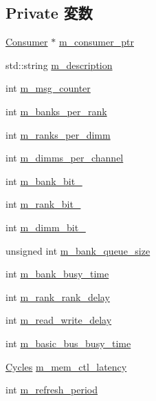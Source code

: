 \subsection*{Private 変数}
\begin{DoxyCompactItemize}
\item 
\hyperlink{classConsumer}{Consumer} $\ast$ \hyperlink{classRubyMemoryControl_a83dd1dc8eef330b0c0d184a4167b26b4}{m\_\-consumer\_\-ptr}
\item 
std::string \hyperlink{classRubyMemoryControl_ad50eef5f7fcfa30f62e14f0fac2a4f6e}{m\_\-description}
\item 
int \hyperlink{classRubyMemoryControl_acfac131e63985feff04ed11cbaf0d221}{m\_\-msg\_\-counter}
\item 
int \hyperlink{classRubyMemoryControl_af5a8b76f5c8fdb638e49a8c11c61f492}{m\_\-banks\_\-per\_\-rank}
\item 
int \hyperlink{classRubyMemoryControl_a734869c8bd10780ed7f61eadb638f30c}{m\_\-ranks\_\-per\_\-dimm}
\item 
int \hyperlink{classRubyMemoryControl_acf7c3dd8c1a61ce9fe7ca2e026150caf}{m\_\-dimms\_\-per\_\-channel}
\item 
int \hyperlink{classRubyMemoryControl_a767e3298a0e794bb0c8f422021e6b67d}{m\_\-bank\_\-bit\_}
\item 
int \hyperlink{classRubyMemoryControl_a2262efb9776ae0e8119e999c6efed38b}{m\_\-rank\_\-bit\_}
\item 
int \hyperlink{classRubyMemoryControl_a9d9676a8a7c87644cefbe758f0ef719c}{m\_\-dimm\_\-bit\_}
\item 
unsigned int \hyperlink{classRubyMemoryControl_a6cbe212586b315223f76b124953ea4b2}{m\_\-bank\_\-queue\_\-size}
\item 
int \hyperlink{classRubyMemoryControl_ab11322175e2e2ec5d6ebef835774bc1a}{m\_\-bank\_\-busy\_\-time}
\item 
int \hyperlink{classRubyMemoryControl_a88f33889677c076f1e5fdd8ce7cabc4d}{m\_\-rank\_\-rank\_\-delay}
\item 
int \hyperlink{classRubyMemoryControl_a469ba8ed68dfdab637a67909cd7f494f}{m\_\-read\_\-write\_\-delay}
\item 
int \hyperlink{classRubyMemoryControl_a0537255983f6c88ed3389efd814780e5}{m\_\-basic\_\-bus\_\-busy\_\-time}
\item 
\hyperlink{classCycles}{Cycles} \hyperlink{classRubyMemoryControl_aaf9472c80a44349fbb83ec29ce2de7ad}{m\_\-mem\_\-ctl\_\-latency}
\item 
int \hyperlink{classRubyMemoryControl_ab046d0568e576a3fd3e751aae694aa6c}{m\_\-refresh\_\-period}

\end{DoxyCompactItemize}
